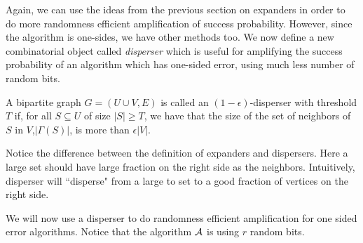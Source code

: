 Again, we can use the ideas from the previous section on expanders in order to do more randomness efficient amplification of success probability. However, since the algorithm is one-sides, we have other methods too. 
We now define a new combinatorial object called \textit{disperser} which is useful for amplifying the success probability of an algorithm which has one-sided error, using much less number of random bits.

\begin{definition}[{\bf Dispersers}]
A bipartite graph $G=(U \cup V, E)$ is called an $(1- \epsilon)$-disperser with threshold $T$ if, for
all $S \subseteq U$ of size $|S|\ge T$, we have that the size of the set of neighbors of $S$ in $V$,$|\Gamma(S)|$, is more than $\epsilon|V|$.
\end{definition}

Notice the difference between the definition of expanders and dispersers. Here a large set should have large fraction on the right side as the neighbors. Intuitively, disperser will ``disperse" from a large to set to a good fraction of vertices on the right side.

We will now use a disperser to do randomness efficient amplification for one sided error algorithms. Notice that the algorithm ${\cal{A}}$ is using $r$ random bits. 

